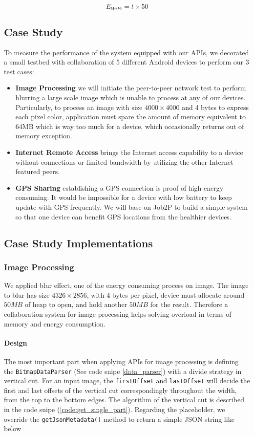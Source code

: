 \documentclass[conference]{IEEEtran}
\begin{document}
$$E_{WiFi} = t \times 50$$


\subsection{Case Study}
To measure the performance of the system equipped with our APIs, we decorated a small testbed with collaboration of 5 different Android devices to perform our 3 test cases:
\begin{itemize}
	\item \textbf{Image Processing} we will initiate the peer-to-peer network test to perform blurring a large scale image which is unable to process at any of our devices. Particularly, to process an image with size $4000 \times 4000$ and 4 bytes to express each pixel color, application must spare the amount of memory equivalent to 64MB which is way too much for a device, which occasionally returns out of memory exception. 
	\item \textbf{Internet Remote Access} brings the Internet access capability to a device without connections or limited bandwidth by utilizing the other Internet-featured peers.
	\item \textbf{GPS Sharing} establishing a GPS connection is proof of high energy consuming. It would be impossible for a device with low battery to keep update with GPS frequently. We will base on Job2P to build a simple system so that one device can benefit GPS locations from the healthier devices.
\end{itemize}

\subsection{Case Study Implementations}

\subsubsection{Image Processing}
We applied blur effect, one of the energy consuming process on image. The image to blur has size $4326 \times 2856$, with 4 bytes per pixel, device must allocate around $50MB$ of heap to open, and hold another $50MB$ for the result. Therefore a collaboration system for image processing helps solving overload in terms of memory and energy consumption.

\paragraph{Design}
The most important part when applying APIs for image processing is defining the \texttt{BitmapDataParser} (See code snipe \ref{data_parser}) with a divide strategy in vertical cut. For an input image, the \texttt{firstOffset} and \texttt{lastOffset} will decide the first and last offsets of the vertical cut correspondingly throughout the width, from the top to the bottom edges. The algorithm of the vertical cut is described in the code snipe (\ref{code:get_single_part}). Regarding the placeholder, we override the \texttt{getJsonMetadata()} method to return a simple JSON string like below\\
\end{document}
